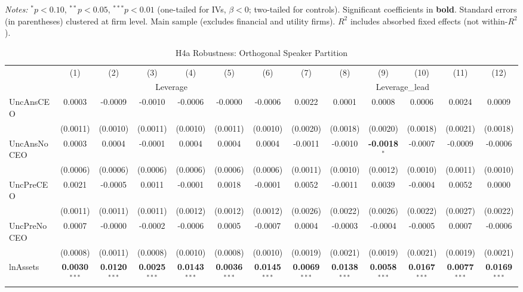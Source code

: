\documentclass[11pt,a4paper]{article}
\begin{document}
\begin{table}[htbp]
\begin{tabular}{lcccccccccccc}
\bottomrule
\end{tabular}
\begin{minipage}{\linewidth}
\vspace{2pt}\scriptsize
\textit{Notes:} $^{*}p<0.10$, $^{**}p<0.05$, $^{***}p<0.01$ (one-tailed for IVs, $\beta < 0$; two-tailed for controls).
 Significant coefficients in \textbf{bold}.
 Standard errors (in parentheses) clustered at firm level.
 Main sample (excludes financial and utility firms).
 $R^2$ includes absorbed fixed effects (not within-$R^2$).
\end{minipage}
\end{table}
\clearpage
\begin{table}[htbp]
\centering
\caption{H4a Robustness: Orthogonal Speaker Partition}
\label{tab:h4a_robust}
\scriptsize
\begin{tabular}{lcccccccccccc}
\toprule
 & (1) & (2) & (3) & (4) & (5) & (6) & (7) & (8) & (9) & (10) & (11) & (12) \\
 & \multicolumn{6}{c}{Leverage} & \multicolumn{6}{c}{Leverage\_lead} \\
\cmidrule(lr){2-7} \cmidrule(lr){8-13}
\midrule
UncAnsCEO & 0.0003 & -0.0009 & -0.0010 & -0.0006 & -0.0000 & -0.0006 & 0.0022 & 0.0001 & 0.0008 & 0.0006 & 0.0024 & 0.0009 \\
 & (0.0011) & (0.0010) & (0.0011) & (0.0010) & (0.0011) & (0.0010) & (0.0020) & (0.0018) & (0.0020) & (0.0018) & (0.0021) & (0.0018) \\
UncAnsNoCEO & 0.0003 & 0.0004 & -0.0001 & 0.0004 & 0.0004 & 0.0004 & -0.0011 & -0.0010 & \textbf{-0.0018}$^{*}$ & -0.0007 & -0.0009 & -0.0006 \\
 & (0.0006) & (0.0006) & (0.0006) & (0.0006) & (0.0006) & (0.0006) & (0.0011) & (0.0010) & (0.0012) & (0.0010) & (0.0011) & (0.0010) \\
UncPreCEO & 0.0021 & -0.0005 & 0.0011 & -0.0001 & 0.0018 & -0.0001 & 0.0052 & -0.0011 & 0.0039 & -0.0004 & 0.0052 & 0.0000 \\
 & (0.0011) & (0.0011) & (0.0011) & (0.0012) & (0.0012) & (0.0012) & (0.0026) & (0.0022) & (0.0026) & (0.0022) & (0.0027) & (0.0022) \\
UncPreNoCEO & 0.0007 & -0.0000 & -0.0002 & -0.0006 & 0.0005 & -0.0007 & 0.0004 & -0.0003 & -0.0004 & -0.0005 & 0.0007 & -0.0006 \\
 & (0.0008) & (0.0011) & (0.0008) & (0.0010) & (0.0008) & (0.0010) & (0.0019) & (0.0021) & (0.0019) & (0.0021) & (0.0019) & (0.0021) \\
\midrule
lnAssets & \textbf{0.0030}$^{***}$ & \textbf{0.0120}$^{***}$ & \textbf{0.0025}$^{***}$ & \textbf{0.0143}$^{***}$ & \textbf{0.0036}$^{***}$ & \textbf{0.0145}$^{***}$ & \textbf{0.0069}$^{***}$ & \textbf{0.0138}$^{***}$ & \textbf{0.0058}$^{***}$ & \textbf{0.0167}$^{***}$ & \textbf{0.0077}$^{***}$ & \textbf{0.0169}$^{***}$ \\

\end{tabular}
\end{table}
\end{document}
